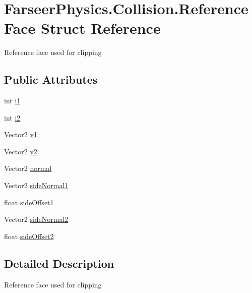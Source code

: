 \hypertarget{struct_farseer_physics_1_1_collision_1_1_reference_face}{\section{Farseer\+Physics.\+Collision.\+Reference\+Face Struct Reference}
\label{struct_farseer_physics_1_1_collision_1_1_reference_face}
}


Reference face used for clipping  


\subsection*{Public Attributes}
\begin{DoxyCompactItemize}
\item 
int \hyperlink{struct_farseer_physics_1_1_collision_1_1_reference_face_a37e737228e08d03f526b4fc47f372372}{i1}
\item 
int \hyperlink{struct_farseer_physics_1_1_collision_1_1_reference_face_a052d03009c9b79cf9f1c160fc51fb7cc}{i2}
\item 
Vector2 \hyperlink{struct_farseer_physics_1_1_collision_1_1_reference_face_ae7dade68c57247cd9467f13380237d6b}{v1}
\item 
Vector2 \hyperlink{struct_farseer_physics_1_1_collision_1_1_reference_face_aee96716c7114f0e2166ca2c9fb07607a}{v2}
\item 
Vector2 \hyperlink{struct_farseer_physics_1_1_collision_1_1_reference_face_a9ae1cc0fc6afb75e71dced7bd7646dde}{normal}
\item 
Vector2 \hyperlink{struct_farseer_physics_1_1_collision_1_1_reference_face_a7985f34c26b753648d9df46688e203cd}{side\+Normal1}
\item 
float \hyperlink{struct_farseer_physics_1_1_collision_1_1_reference_face_a2753902840baf43c24f99ef4bd804c3c}{side\+Offset1}
\item 
Vector2 \hyperlink{struct_farseer_physics_1_1_collision_1_1_reference_face_a84eae4f8633cf93f8f08ede2be731981}{side\+Normal2}
\item 
float \hyperlink{struct_farseer_physics_1_1_collision_1_1_reference_face_aa0224292b2784cd518294f488b71910d}{side\+Offset2}
\end{DoxyCompactItemize}


\subsection{Detailed Description}
Reference face used for clipping 




